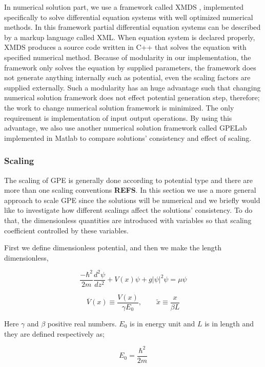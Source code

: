 \documentclass[a4paper,times,hidelinks,12pt]{article}
\begin{document}
In numerical solution part, we use a framework called XMDS \cite{dennis2013xmds2}, implemented specifically to solve differential equation systems with well optimized numerical methods. In this framework partial differential equation systems can be described by a markup language called XML.  When equation system is declared properly, XMDS produces a source code written in C++ that solves the equation with specified numerical method. Because of modularity in our implementation, the framework only solves the equation by supplied parameters, the framework does not generate anything internally such as potential, even the scaling factors are supplied externally. Such a modularity has an huge advantage such that changing numerical solution framework does not effect potential generation step, therefore; the work to change numerical solution framework is minimized. The only requirement is implementation of input output operations. By using this advantage, we also use another numerical solution framework called GPELab \cite{antoine2014gpelab} implemented in Matlab to compare solutions' consistency and effect of scaling.


\subsubsection{Scaling}

The scaling of GPE is generally done according to potential type and there are more than one scaling conventions \textbf{REFS}. In this section we use a more general approach to scale GPE since the solutions will be numerical and we briefly would like to investigate how different scalings affect the solutions' consistency. To do that, the dimensionless quantities are introduced with variables so that scaling coefficient controlled by these variables. 

First we define dimensionless potential, and then we make the length dimensionless,

\begin{equation}
    \label{eq:GPE_1D}
    \frac{-\hbar^2}{2m}\frac{d^2\psi}{dz^2} + V(x)\psi + g|\psi|^2\psi = \mu\psi
\end{equation}


$$ \overline{V}(x) \equiv \frac{V(x)}{\gamma E_0}, \qquad \widetilde{x} \equiv \frac{x}{\beta L} $$

Here $\gamma$ and $\beta$ positive real numbers. $E_0$ is in energy unit and $L$ is in length and they are defined respectively as;

$$E_0 = \frac{\hbar^2}{2m} $$
\end{document}
